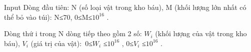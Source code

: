 Input
Dòng đầu tiên: N (số loại vật trong kho báu), M (khối lượng lớn nhất có thể bỏ vào túi): N≤70, 0≤M≤$10^{16}$ .

Dòng thứ i trong N dòng tiếp theo gồm 2 số: $W_{i}$ (khối lượng của vật trong kho báu), $V_{i}$ (giá trị của vật): 0≤$W_{i}$ ≤$10^{16}$ , 0≤$V_{i}$ ≤$10^{16}$ .